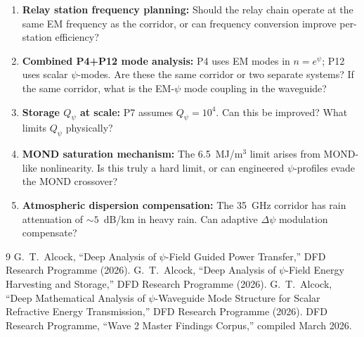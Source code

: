 \documentclass[aps,prd,twocolumn,superscriptaddress]{revtex4-2}
\newcommand{\Qpsi}{Q_\psi}
\begin{document}
\begin{enumerate}
\item \textbf{Relay station frequency planning:}  Should the relay
chain operate at the same EM frequency as the corridor, or can
frequency conversion improve per-station efficiency?

\item \textbf{Combined P4+P12 mode analysis:}  P4 uses EM modes in
$n = e^\psi$; P12 uses scalar $\psi$-modes.  Are these the same
corridor or two separate systems?  If the same corridor, what is
the EM-$\psi$ mode coupling in the waveguide?

\item \textbf{Storage $Q_\psi$ at scale:}  P7 assumes $\Qpsi = 10^4$.
Can this be improved?  What limits $\Qpsi$ physically?

\item \textbf{MOND saturation mechanism:}  The 6.5~MJ/m$^3$ limit
arises from MOND-like nonlinearity.  Is this truly a hard limit, or
can engineered $\psi$-profiles evade the MOND crossover?

\item \textbf{Atmospheric dispersion compensation:}  The 35~GHz
corridor has rain attenuation of $\sim 5$~dB/km in heavy rain.
Can adaptive $\Delta\psi$ modulation compensate?
\end{enumerate}

\begin{thebibliography}{9}
 G.~T.~Alcock, ``Deep Analysis of $\psi$-Field Guided
Power Transfer,'' DFD Research Programme (2026).
 G.~T.~Alcock, ``Deep Analysis of $\psi$-Field Energy
Harvesting and Storage,'' DFD Research Programme (2026).
 G.~T.~Alcock, ``Deep Mathematical Analysis of
$\psi$-Waveguide Mode Structure for Scalar Refractive Energy
Transmission,'' DFD Research Programme (2026).
 DFD Research Programme, ``Wave 2 Master Findings
Corpus,'' compiled March 2026.
\end{thebibliography}
\end{document}
